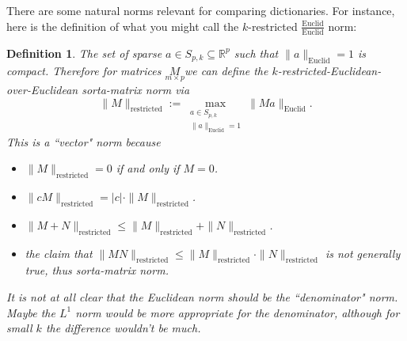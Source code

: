 \documentclass[11pt]{amsart}
\newtheorem{definition}{Definition}
\begin{document}
There are some natural norms relevant for comparing dictionaries.  For instance, here is the definition of what you might call
the $k$-restricted $\frac{\text{Euclid}}{\text{Euclid}}$ norm: 
\begin{definition}
The set of sparse $a\in S_{p,k}\subseteq \mathbb{R}^p$ such that $\|a\|_\text{Euclid}=1$ is compact.
Therefore for matrices $\underset{m\times p}{M}$we can define the $k$-restricted-Euclidean-over-Euclidean sorta-matrix norm via
\begin{equation}
\|M\|_\text{restricted}:=\underset{\substack{a\in S_{p,k} \\ \|a\|_\text{Euclid}= 1}}{\max}  \|Ma\|_\text{Euclid}.
\end{equation}
This is a ``vector" norm because 
\begin{itemize}
\item $\|M\|_\text{restricted}=0$ if and only if $M=0$.
\item $\|cM\|_\text{restricted}=|c|\cdot \|M\|_\text{restricted}$.
\item $\|M+N\|_\text{restricted}\leq \|M\|_\text{restricted}+\|N\|_\text{restricted}$.
\item the claim that $\|MN\|_\text{restricted}\leq \|M\|_\text{restricted} \cdot \|N\|_\text{restricted}$ is not generally true, thus 
sorta-matrix norm.
\end{itemize}
It is not at all clear that the Euclidean norm should be the ``denominator" norm.  Maybe the $L^1$ norm would be more appropriate
for the denominator, although for small $k$ the difference wouldn't be much.  
\end{definition}
\end{document}
